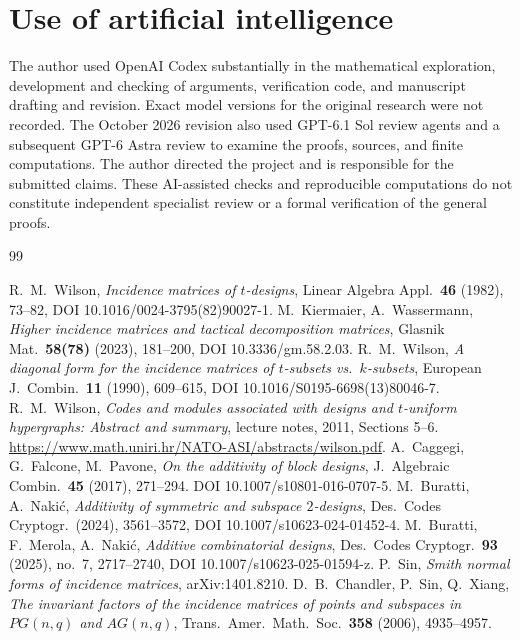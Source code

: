 \documentclass[11pt,a4paper]{article}
\begin{document}
\section*{Use of artificial intelligence}
The author used OpenAI Codex substantially in the mathematical exploration,
development and checking of arguments, verification code, and manuscript
drafting and revision. Exact model versions for the original research were
not recorded. The October 2026 revision also used GPT-6.1 Sol review agents
and a subsequent GPT-6 Astra review to examine the proofs, sources, and
finite computations. The author directed
the project and is responsible for the submitted claims. These AI-assisted
checks and reproducible computations do not constitute independent specialist
review or a formal verification of the general proofs.

\begin{thebibliography}{99}
\raggedright
{} R.~M.~Wilson, \emph{Incidence matrices of $t$-designs},
  Linear Algebra Appl.\ \textbf{46} (1982), 73--82,
  DOI 10.1016/0024-3795(82)90027-1.
 M.~Kiermaier, A.~Wassermann,
  \emph{Higher incidence matrices and tactical decomposition matrices},
  Glasnik Mat.\ \textbf{58(78)} (2023), 181--200,
  DOI 10.3336/gm.58.2.03.
 R.~M.~Wilson, \emph{A diagonal form for the incidence matrices
  of $t$-subsets vs.\ $k$-subsets}, European J.\ Combin.\ \textbf{11} (1990),
  609--615, DOI 10.1016/S0195-6698(13)80046-7.
 R.~M.~Wilson, \emph{Codes and modules associated with
  designs and $t$-uniform hypergraphs: Abstract and summary}, lecture notes,
  2011, Sections 5--6.
  \url{https://www.math.uniri.hr/NATO-ASI/abstracts/wilson.pdf}.
 A.~Caggegi, G.~Falcone, M.~Pavone, \emph{On the additivity of
  block designs}, J.\ Algebraic Combin.\ \textbf{45} (2017), 271--294.
  DOI 10.1007/s10801-016-0707-5.
 M.~Buratti, A.~Naki\'c, \emph{Additivity of symmetric and
  subspace $2$-designs}, Des.\ Codes Cryptogr.\ (2024), 3561--3572,
  DOI 10.1007/s10623-024-01452-4.
 M.~Buratti, F.~Merola, A.~Naki\'c, \emph{Additive
  combinatorial designs}, Des.\ Codes Cryptogr.\ \textbf{93} (2025), no.~7,
  2717--2740, DOI 10.1007/s10623-025-01594-z.
 P.~Sin, \emph{Smith normal forms of incidence matrices},
  arXiv:1401.8210.
 D.~B.~Chandler, P.~Sin, Q.~Xiang, \emph{The invariant
  factors of the incidence matrices of points and subspaces in $PG(n,q)$ and
  $AG(n,q)$}, Trans.\ Amer.\ Math.\ Soc.\ \textbf{358} (2006), 4935--4957.

\end{thebibliography}
\end{document}
